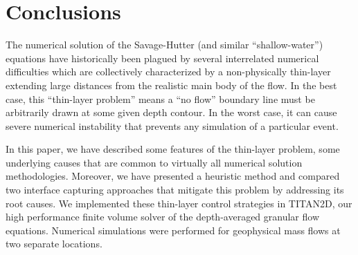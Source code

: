 \documentclass[letterpaper,10pt]{article}
\begin{document}
%
%
% 
% 



\section{Conclusions} \label{conclusions}
The numerical solution of the Savage-Hutter (and similar 
``shallow-water'') equations have historically been plagued by 
several interrelated numerical difficulties which are collectively 
characterized by a non-physically thin-layer extending 
large distances from the realistic main body of the flow. In the 
best case, this ``thin-layer problem'' means a ``no flow'' boundary 
line must be arbitrarily drawn at some given depth contour.  In 
the worst case, it can cause severe numerical instability that 
prevents any simulation of a particular event.

In this paper, we 
have described some features of the thin-layer problem,
some underlying causes that are common to virtually all numerical 
solution methodologies.  Moreover, we have presented a heuristic method and compared 
two interface capturing approaches that 
mitigate this problem by addressing its root causes.  We 
implemented these thin-layer control strategies in TITAN2D, our high 
performance finite volume solver of the depth-averaged granular 
flow equations.  Numerical simulations were performed for 
geophysical mass flows at two separate locations.
\end{document}
